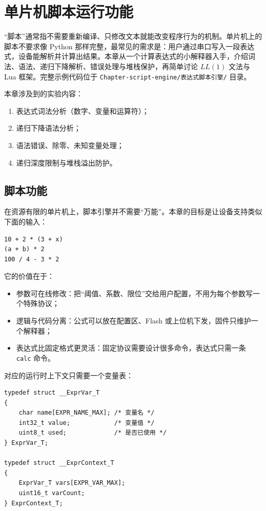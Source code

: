 \chapter{单片机脚本运行功能} \label{ch:script-engine}

“脚本”通常指不需要重新编译、只修改文本就能改变程序行为的机制。单片机上的脚本不要求像 Python 那样完整，最常见的需求是：用户通过串口写入一段表达式，设备能解析并计算出结果。本章从一个计算表达式的小解释器入手，介绍词法、语法、递归下降解析、错误处理与堆栈保护，再简单讨论 $LL(1)$ 文法与 Lua 框架。完整示例代码位于 \texttt{Chapter-script-engine/表达式脚本引擎/} 目录。

\medskip 本章涉及到的实验内容：
\begin{enumerate}
\item 表达式词法分析（数字、变量和运算符）；
\item 递归下降语法分析；
\item 语法错误、除零、未知变量处理；
\item 递归深度限制与堆栈溢出防护。
\end{enumerate}

\section{脚本功能}

在资源有限的单片机上，脚本引擎并不需要“万能”。本章的目标是让设备支持类似下面的输入：

\begin{lstlisting}
10 + 2 * (3 + x)
(a + b) * 2
100 / 4 - 3 * 2
\end{lstlisting}

它的价值在于：

\begin{itemize}
\item 参数可在线修改：把“阈值、系数、限位”交给用户配置，不用为每个参数写一个特殊协议；
\item 逻辑与代码分离：公式可以放在配置区、Flash 或上位机下发，固件只维护一个解释器；
\item 表达式比固定格式更灵活：固定协议需要设计很多命令，表达式只需一条 \texttt{calc} 命令。
\end{itemize}

对应的运行时上下文只需要一个变量表：

\begin{lstlisting}[style=c]
typedef struct __ExprVar_T
{
    char name[EXPR_NAME_MAX]; /* 变量名 */
    int32_t value;            /* 变量值 */
    uint8_t used;             /* 是否已使用 */
} ExprVar_T;

typedef struct __ExprContext_T
{
    ExprVar_T vars[EXPR_VAR_MAX];
    uint16_t varCount;
} ExprContext_T;
\end{lstlisting}

